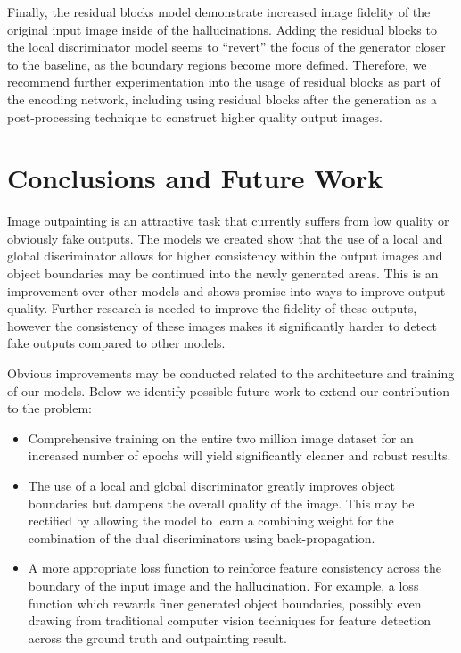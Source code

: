 \documentclass{article}
\begin{document}
Finally, the residual blocks model demonstrate increased image fidelity of the original input image inside of the hallucinations. Adding the residual blocks to the local discriminator model seems to ``revert'' the focus of the generator closer to the baseline, as the boundary regions become more defined. Therefore, we recommend further experimentation into the usage of residual blocks as part of the encoding network, including using residual blocks after the generation as a post-processing technique to construct higher quality output images.

\section{Conclusions and Future Work}
Image outpainting is an attractive task that currently suffers from low quality or obviously fake outputs. The models we created show that the use of a local and global discriminator allows for higher consistency within the output images and object boundaries may be continued into the newly generated areas. This is an improvement over other models and shows promise into ways to improve output quality. Further research is needed to improve the fidelity of these outputs, however the consistency of these images makes it significantly harder to detect fake outputs compared to other models.

Obvious improvements may be conducted related to the architecture and training of our models. Below we identify possible future work to extend our contribution to the problem:
\begin{itemize}
\setlength{\partopsep}{0pt}
\setlength{\topsep}{0pt}
\setlength{\itemsep}{1pt}
	\item{Comprehensive training on the entire two million image dataset for an increased number of epochs will yield significantly cleaner and robust results.}
	\item{The use of a local and global discriminator greatly improves object boundaries but dampens the overall quality of the image. This may be rectified by allowing the model to learn a combining weight for the combination of the dual discriminators using back-propagation.}
	\item{A more appropriate loss function to reinforce feature consistency across the boundary of the input image and the hallucination. For example, a loss function which rewards finer generated object boundaries, possibly even drawing from traditional computer vision techniques for feature detection across the ground truth and outpainting result.}
\end{itemize}



\end{document}
